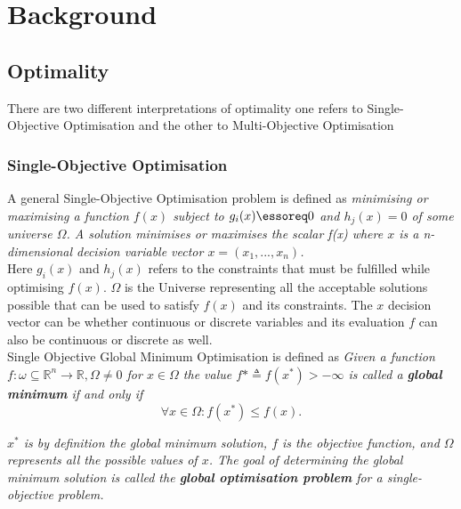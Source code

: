 \chapter{Background}
\label{chapter:chapter02}

\section{Optimality}

There are two different interpretations of optimality one refers to Single-Objective Optimisation and the other to Multi-Objective Optimisation\\

\subsection{Single-Objective Optimisation}

A general Single-Objective Optimisation problem is defined as \textit{minimising or maximising a function $f(x)$ subject to $g_i(x) \essoreq 0$ and $h_j(x) = 0$ of some universe $\Omega$. A solution minimises or maximises the scalar f(x) where $x$ is a n-dimensional decision variable vector $x = (x_1,...,x_n)$.}\\
 
Here $g_i(x)$ and $h_j(x)$ refers to the constraints that must be fulfilled while optimising $f(x)$. $\Omega$ is the Universe representing all the acceptable solutions possible that can be used to satisfy $f(x)$ and its constraints. The $x$ decision vector can be whether continuous or discrete variables and its evaluation $f$ can also be continuous or discrete as well.\\

Single Objective Global Minimum Optimisation is defined as \textit{Given a function $f: \omega \subseteq \mathbb{R}^n \rightarrow \mathbb{R}, \Omega \neq 0$ for $x \in \Omega$ the value $f* \triangleq f(x^*) > -\infty$ is called a \textbf{global minimum} if and only if}\\

\begin{equation}
    \forall x \in \Omega: f(x^*) \leq f(x).
\end{equation}

\textit{$x^*$ is by definition the global minimum solution, $f$ is the objective function, and $\Omega$ represents all the possible values of $x$. The goal of determining the global minimum solution is called the \textbf{global optimisation problem} for a single-objective problem.}\\

